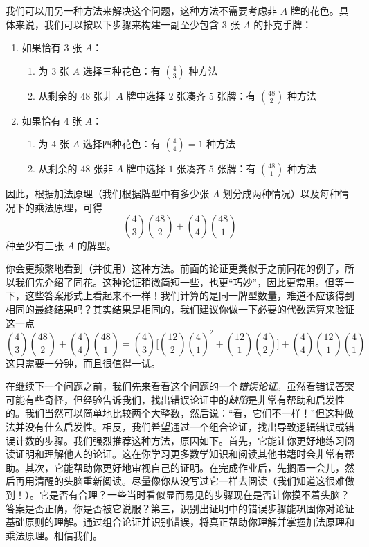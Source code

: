 \begin{example}[至少三张 $A$]
    我们可以用另一种方法来解决这个问题，这种方法不需要考虑非 $A$ 牌的花色。具体来说，我们可以按以下步骤来构建一副至少包含 $3$ 张 $A$ 的扑克手牌：
    \begin{enumerate}
        \item 如果恰有 $3$ 张 $A$：
              \begin{enumerate}[label=(\alph*)]
                  \item 为 $3$ 张 $A$ 选择三种花色：有 ${4 \choose 3}$ 种方法
                  \item 从剩余的 $48$ 张非 $A$ 牌中选择 $2$ 张凑齐 $5$ 张牌：有 ${48 \choose 2}$ 种方法
              \end{enumerate}
        \item 如果恰有 $4$ 张 $A$：
              \begin{enumerate}[label=(\alph*)]
                  \item 为 $4$ 张 $A$ 选择四种花色：有 ${4 \choose 4} = 1$ 种方法
                  \item 从剩余的 $48$ 张非 $A$ 牌中选择 $1$ 张凑齐 $5$ 张牌：有 ${48 \choose 1}$ 种方法
              \end{enumerate}
    \end{enumerate}
    因此，根据加法原理（我们根据牌型中有多少张 $A$ 划分成两种情况）以及每种情况下的乘法原理，可得
    \[{4 \choose 3}{48 \choose 2}+{4 \choose 4}{48 \choose 1}\]
    种至少有三张 $A$ 的牌型。

    你会更频繁地看到（并使用）这种方法。前面的论证更类似于之前同花的例子，所以我们先介绍了同花。这种论证稍微简短一些，也更``巧妙''，因此更常用。但等一下，这些答案形式上看起来不一样！我们计算的是同一牌型数量，难道不应该得到相同的最终结果吗？其实结果是相同的，我们建议你做一下必要的代数运算来验证这一点
    \[{4 \choose 3}{48 \choose 2}+{4 \choose 4}{48 \choose 1} = {4 \choose 3}\Bigg[{12 \choose 2} {4 \choose 1}^2 + {12 \choose 1} {4 \choose 2}\Bigg] + {4 \choose 4}{12 \choose 1}{4 \choose 1}\]
    这只需要一分钟，而且很值得一试。
\end{example}

在继续下一个问题之前，我们先来看看这个问题的一个\emph{错误论证}。虽然看错误答案可能有些奇怪，但经验告诉我们，找出错误论证中的\emph{缺陷}是非常有帮助和启发性的。我们当然可以简单地比较两个大整数，然后说：``看，它们不一样！''但这种做法并没有什么启发性。相反，我们希望通过一个组合论证，找出导致逻辑错误或错误计数的步骤。我们强烈推荐这种方法，原因如下。首先，它能让你更好地练习阅读证明和理解他人的论证。这在你学习更多数学知识和阅读其他书籍时会非常有帮助。其次，它能帮助你更好地审视自己的证明。在完成作业后，先搁置一会儿，然后再用清醒的头脑重新阅读。尽量像你从没写过它一样去阅读（我们知道这很难做到！）。它是否有合理？一些当时看似显而易见的步骤现在是否让你摸不着头脑？答案是否正确，你是否被它说服？第三，识别出证明中的错误步骤能巩固你对论证基础原则的理解。通过组合论证并识别错误，将真正帮助你理解并掌握加法原理和乘法原理。相信我们。

